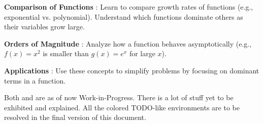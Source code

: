  \label{ch:Quick Summary}

\vspace{2ex} %

\textbf{Comparison of Functions } : Learn to compare growth rates of functions (e.g., exponential vs. polynomial). Understand which functions dominate others as their variables grow large.

\textbf{Orders of Magnitude } : Analyze how a function behaves asymptotically (e.g., \(f(x)=x^2\) is smaller than \(g(x)=e^x\) for large $x$).

\textbf{Applications } : Use these concepts to simplify problems by focusing on dominant terms in a function.

\begin{Note}
    Both  and  are as of now Work-in-Progress.
    There is a lot of stuff yet to be exhibited and explained.
    All the colored \textsf{TODO}-like environments are to be resolved in the final version of this document.
\end{Note}
